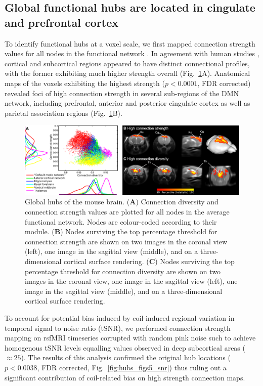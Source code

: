 \subsection{Global functional hubs are located in cingulate and prefrontal
cortex}

To identify functional hubs at a voxel scale, we first mapped connection
strength values for all nodes in the functional network \parencite{rubinov2011}.
In agreement with human studies \parencite{tomasi2011}, cortical and subcortical
regions appeared to have distinct connectional profiles, with the former
exhibiting much higher strength overall (Fig.~\ref{fig:hubs_fig2_global_hubs}A).
Anatomical maps of the voxels exhibiting the highest strength ($p < 0.0001$, FDR
corrected) revealed foci of high connection strength in several sub-regions of
the DMN network, including prefrontal, anterior and posterior cingulate cortex
as well as parietal association regions (Fig.~\ref{fig:hubs_fig2_global_hubs}B). 

\begin{figure}[th]
    \centering
    \includegraphics[scale=0.7]{figures/hubs_figure_02_hubs_global_NEW.png}
    \decoRule
    \caption[Global hubs of the mouse brain.]{Global hubs of the mouse brain.
    (\textbf{A}) Connection diversity and connection strength values are plotted
    for all nodes in the average functional network. Nodes are colour-coded
    according to their module. (\textbf{B}) Nodes surviving the top percentage
    threshold for connection strength are shown on two images in the coronal
    view (left), one image in the sagittal view (middle), and on a
    three-dimensional cortical surface rendering. (\textbf{C}) Nodes surviving
    the top percentage threshold for connection diversity are shown on two
    images in the coronal view, one image in the sagittal view (left), one image
    in the sagittal view (middle), and on a three-dimensional cortical surface
    rendering.}
    \label{fig:hubs_fig2_global_hubs}
\end{figure}


To account for potential bias induced by coil-induced regional variation in
temporal signal to noise ratio (tSNR), we performed connection strength mapping
on rsfMRI timeseries corrupted with random pink noise such to achieve homogenous
tSNR levels equalling values observed in deep subcortical areas ($\approx 25$).
The results of this analysis confirmed the original hub locations ($p < 0.0038$,
FDR corrected, Fig.~\ref{fig:hubs_figs5_snr}) thus ruling out a significant
contribution of coil-related bias on high strength connection maps.

